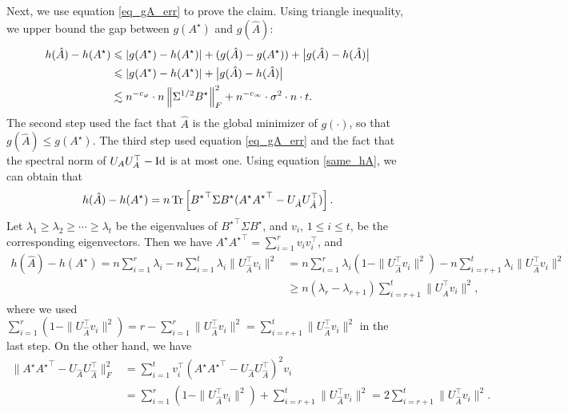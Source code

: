 	\bigskip
	Next, we use equation \eqref{eq_gA_err} to prove the claim.
	Using triangle inequality, we upper bound the gap between $g(A^{\star})$ and $g(\hat{A})$:
	\begin{align}
		h(\hat{A})- h(A^{\star})   &\leqslant {\left| {g(A^{\star}) - h(A^{\star})} \right|} + (g(\hat A) - g({A}^{\star})) + \big|g(\hat{A}) - h(\hat{A})\big| \nonumber \\
		&\leqslant {\left| {g(A^{\star}) - h(A^{\star})} \right|}  + \big|g(\hat{A}) - h(\hat{A})\big|\nonumber \\
		&\lesssim n^{-c_\varphi}\cdot n \left\| \Sigma^{1/2} B^{\star} \right\|_{F}^2 + n^{-c_\infty}\cdot \sigma^2 \cdot n \cdot t. \label{eq_g_gap}
	\end{align}
	The second step used the fact that $\hat A$ is the global minimizer of $g(\cdot)$, so that $g(\hat A) \le g({A}^\star)$.
	The third step used equation \eqref{eq_gA_err} and the fact that the spectral norm of $U_A U_A^{\top} - \operatorname{Id}$ is at most one. 
	Using equation \eqref{same_hA}, we can obtain that
	$$h(\hat A)-h(A^\star) = n \operatorname{Tr}\left[{B^\star}^\top\Sigma B^\star ( A^\star {A^\star}^\top -U_{\hat A}U^\top_{\hat A})\right] .$$
	Let $\lambda_1\ge\lambda_2 \ge \cdots\ge \lambda_t$ be the eigenvalues of ${B^\star}^\top\Sigma B^\star$, and $v_i$, $1\le i \le t$, be the corresponding eigenvectors. Then we have $A^\star {A^\star}^\top =\sum_{i=1}^r v_i v_i^\top$, and 
	\begin{align}
	h(\hat A)-h(A^\star) = n \sum_{i=1}^r \lambda_i - n\sum_{i=1}^t \lambda_i \| U^\top_{\hat A} v_i\|^2 &= n\sum_{i=1}^r \lambda_i\left(1 -  \| U^\top_{\hat A} v_i\|^2\right)-n\sum_{i=r+1}^t \lambda_i \| U^\top_{\hat A} v_i\|^2 \nonumber\\
	&\ge  n(\lambda_r-\lambda_{r+1}) \sum_{i=r+1}^t \| U^\top_{\hat A} v_i\|^2 , \label{bdd_A-A}
	\end{align}
	where we used $\sum_{i=1}^r \left(1 -  \| U^\top_{\hat A} v_i\|^2\right) = r- \sum_{i=1}^r  \| U^\top_{\hat A} v_i\|^2 =\sum_{i=r+1}^t \| U^\top_{\hat A} v_i\|^2  $ in the last step. On the other hand, we have 
	\begin{align*}
	\| A^\star {A^\star}^\top -U_{\hat A}U^\top_{\hat A}\|_F^2 & =\sum_{i=1}^t v_i^\top (A^\star {A^\star}^\top -U_{\hat A}U^\top_{\hat A})^2 v_i \\
	& =\sum_{i=1}^r \left(1 -  \| U^\top_{\hat A} v_i\|^2\right) + \sum_{i=r+1}^t \| U^\top_{\hat A} v_i\|^2 =2 \sum_{i=r+1}^t \| U^\top_{\hat A} v_i\|^2.
	\end{align*}
